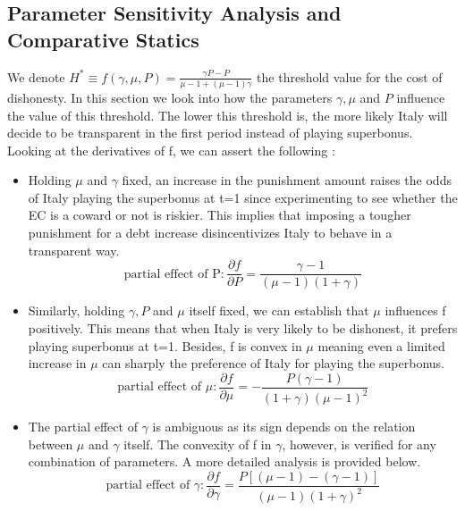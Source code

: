 \documentclass{article}
\begin{document}
\subsection{Parameter Sensitivity Analysis and Comparative Statics}
We denote $H^*\equiv f(\gamma,\mu,P)=\frac{\gamma P-P}{\mu-1+(\mu-1)\gamma}$ the threshold value for the cost of dishonesty. In this section we look into how the parameters $\gamma,\mu$ and $P$ influence the value of this threshold. The lower this threshold is, the more likely Italy will decide to be transparent in the first period instead of playing superbonus. 
Looking at the derivatives of f, we can assert the following : 
\begin{itemize}
    \item Holding $\mu$ and $\gamma$ fixed, an increase in the punishment amount raises the odds of Italy playing the superbonus at t=1 since experimenting to see whether the EC is a coward or not is riskier. This implies that imposing a tougher punishment for a debt increase disincentivizes Italy to behave in a transparent way.
    $$\text{partial effect of P} :\frac{\partial f}{\partial P} = \frac{\gamma - 1}{(\mu - 1)(1 + \gamma)} $$
    \item Similarly, holding $\gamma,P$ and $\mu$ itself fixed, we can establish that $\mu$ influences f positively. This means that when Italy is very likely to be dishonest, it prefers playing superbonus at t=1. Besides, f is convex in $\mu$ meaning even a limited increase in $\mu$ can sharply the preference of Italy for playing the superbonus. 
        $$\text{partial effect of $\mu$} : \frac{\partial f}{\partial \mu} = -\frac{P(\gamma - 1)}{(1 + \gamma)(\mu - 1)^2}  $$
    \item The partial effect of $\gamma$ is ambiguous as its sign depends on the relation between $\mu$ and $\gamma$ itself. The convexity of f in $\gamma$, however, is verified for any combination of parameters. A more detailed analysis is provided below. 
    $$\text{partial effect of $\gamma$} : \frac{\partial f}{\partial \gamma} = \frac{P \left[ (\mu - 1) - (\gamma - 1) \right]}{(\mu - 1)(1 + \gamma)^2}  $$
\end{itemize}
\end{document}
